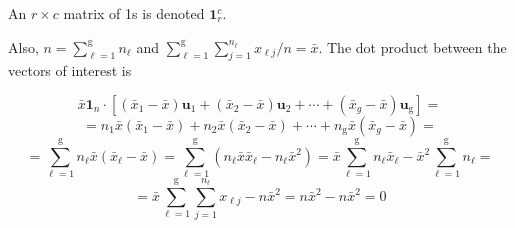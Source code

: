 An $r \times c$ matrix of 1s is denoted $\textbf{1}_{r}^{c}$.

Also, $n = \sum_{\ell=1}^{\text{g}}{n_{\ell}}$ and $\sum_{\ell=1}^{\text{g}}
\sum_{j=1}^{n_{\ell}}
{x_{\ell j}}/n = \bar{x}$.
The dot product between the vectors of interest is

\[
    \bar{x} \textbf{1}_{n}
    \cdot
    [
        (\bar{x}_{1} - \bar{x}) \textbf{u}_{1}
        +
        (\bar{x}_{2} - \bar{x}) \textbf{u}_{2}
        + \cdots +
        (\bar{x}_{g} - \bar{x}) \textbf{u}_{\text{g}}
    ]
    =
\]
\[
    =
    n_{1} \bar{x} (\bar{x}_{1} - \bar{x})
    +
    n_{2} \bar{x} (\bar{x}_{2} - \bar{x})
    + \cdots +
    n_{\text{g}} \bar{x} (\bar{x}_{g} - \bar{x})
=
\]
\[
    =
    \sum_{\ell=1}^{\text{g}}
    {
        n_{\ell} \bar{x} (\bar{x}_{\ell} - \bar{x})
    }
    =
    \sum_{\ell=1}^{\text{g}}
    {
        \left(
            n_{\ell} \bar{x} \bar{x}_{\ell}
            -
            n_{\ell} \bar{x}^{2}
        \right)
    }
    =
    \bar{x}
    \sum_{\ell=1}^{\text{g}}
    {n_{\ell} \bar{x}_{\ell}}
        -
    \bar{x}^{2}
    \sum_{\ell=1}^{\text{g}}
    {n_{\ell}}
    =
\]
\[
    =
    \bar{x}
    \sum_{\ell=1}^{\text{g}}
    \sum_{j=1}^{n_{\ell}}
    {x_{\ell j}}
    -
    n\bar{x}^{2}
    =
    n\bar{x}^{2}
    -
    n\bar{x}^{2}
    =
    0
\]
